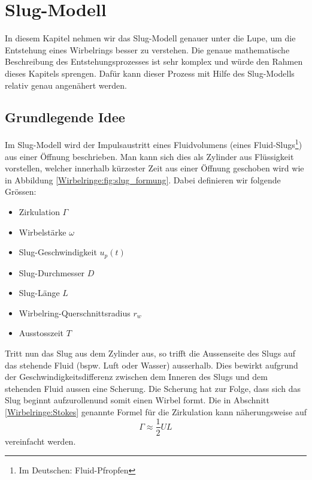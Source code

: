 %
%
%
\section{Slug-Modell}
In diesem Kapitel nehmen wir das Slug-Modell genauer unter die Lupe, um die Entstehung eines Wirbelrings besser zu verstehen.
Die genaue mathematische Beschreibung des Entstehungsprozesses ist sehr komplex und würde den Rahmen dieses Kapitels sprengen.
Dafür kann dieser Prozess mit Hilfe des Slug-Modells relativ genau angenähert werden.

\subsection{Grundlegende Idee}
Im Slug-Modell wird der Impulsaustritt eines Fluidvolumens (eines Fluid-Slugs\footnote{Im Deutschen: Fluid-Pfropfen}) aus einer Öffnung beschrieben.
Man kann sich dies als Zylinder aus Flüssigkeit vorstellen, welcher innerhalb kürzester Zeit aus einer Öffnung geschoben wird wie in Abbildung \ref{Wirbelringe:fig:slug_formung}.
Dabei definieren wir folgende Grössen:
\begin{itemize}
    \item Zirkulation $\Gamma$
    \item Wirbelstärke $\omega$
    \item Slug-Geschwindigkeit $u_p(t)$
    \item Slug-Durchmesser $D$
    \item Slug-Länge $L$
    \item Wirbelring-Querschnittsradius $r_w$
    \item Ausstosszeit \(T\)
\end{itemize}



Tritt nun das Slug aus dem Zylinder aus, so trifft die Aussenseite des Slugs auf das stehende Fluid (bspw. Luft oder Wasser) ausserhalb.
Dies bewirkt aufgrund der Geschwindigkeitsdifferenz zwischen dem Inneren des Slugs und dem stehenden Fluid aussen eine Scherung.
Die Scherung hat zur Folge, dass sich das Slug beginnt \glqq aufzurollen\grqq und somit einen Wirbel formt. 
Die in Abschnitt \ref{Wirbelringe:Stokes} genannte Formel für die Zirkulation kann näherungsweise auf
\begin{equation*}
\Gamma 
\approx 
\frac{1}{2}UL
\end{equation*}
vereinfacht werden.

